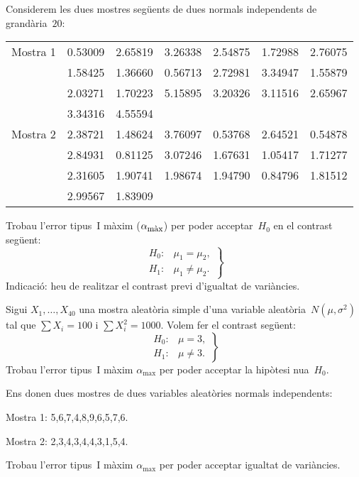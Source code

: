 \begin{prob}
{
Considerem les dues mostres seg\"uents de dues normals independents
de grand\`aria~$20$:
\begin{center}
\begin{tabular}{lllllll}
Mostra 1& 0.53009&2.65819&3.26338&2.54875&1.72988&2.76075 \\ &1.58425&
1.36660&0.56713&2.72981&3.34947&1.55879\\ &2.03271&1.70223&5.15895&
3.20326&3.11516&2.65967\\&3.34316&4.55594&&&&\\
Mostra 2&2.38721&1.48624&3.76097&0.53768&2.64521&0.54878\\&2.84931&
0.81125&3.07246&1.67631&1.05417&1.71277\\ &2.31605&1.90741&1.98674&
1.94790&0.84796&1.81512\\&2.99567&1.83909&&&&\\\hline
\end{tabular}
\end{center}
Trobau l'error tipus~I m\`axim ($\alpha_{\mbox{\footnotesize m\`ax}}$) per
poder acceptar~$H_0$ en el contrast seg\"uent:
\[
\left.
\begin{array}{ll}
H_0:& \mu_1  = \mu_2, \\
H_1:& \mu_1  \not =  \mu_2.
\end{array}
\right\}
\]
\noindent Indicaci\'o: heu de realitzar el contrast previ d'igualtat
de vari\`ancies.
}
\end{prob}

\begin{prob}
{
Sigui $X_1,\ldots,X_{40}$ una mostra aleat\`oria simple d'una variable
aleat\`oria~$N(\mu,\sigma^2)$ tal que $\sum X_i =100$ i $\sum X_i^2 =1000$.
Volem fer el contrast seg\"uent:
\[
\left.
\begin{array}{ll}
H_0:&\mu =3,\\
H_1:&\mu\not = 3.
\end{array}
\right\}
\]
Trobau l'error tipus~I m\`axim $\alpha_{\max}$ per poder acceptar la hip\`otesi
nu{\lgem}a~$H_0$.
}
\end{prob}

\begin{prob}
{
Ens donen dues mostres de dues variables aleat\`ories normals
independents:

\noindent Mostra 1: 5,6,7,4,8,9,6,5,7,6.

\noindent Mostra 2: 2,3,4,3,4,4,3,1,5,4.

Trobau l'error tipus~I m\`axim $\alpha_{\max}$ per poder acceptar 
igualtat de vari\`ancies.
}
\end{prob}

